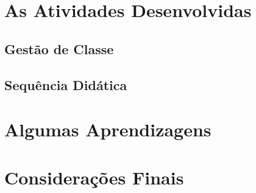 \documentclass[a4paper,10pt]{article}
\begin{document}
    
  \section{As Atividades Desenvolvidas}
  \subsection{Gestão de Classe}

  \subsection{Sequência Didática}

  \section{Algumas Aprendizagens}
  
  \section{Considerações Finais}
  \newpage
\end{document}
